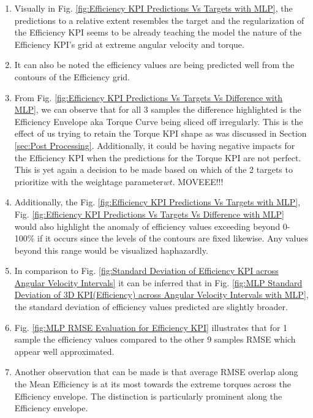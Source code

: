 \documentclass{report} %
\begin{document}
\begin{enumerate}[nosep]
    \item Visually in Fig. \ref{fig:Efficiency KPI Predictions Vs Targets with MLP}, the predictions to a relative extent resembles the target and the regularization 
    of the Efficiency \ac{KPI} seems to be already teaching the model the nature of the Efficiency \ac{KPI}'s grid at extreme angular velocity and torque. 
    \item It can also be noted the efficiency values are being predicted well from the contours of the Efficiency grid.
    \item From Fig. \ref{fig:Efficiency KPI Predictions Vs Targets Vs Difference with MLP}, we can observe that for all 3 samples the difference highlighted is 
    the Efficiency Envelope aka Torque Curve being sliced off irregularly. This is the effect of us trying to retain the Torque \ac{KPI} shape as was 
    discussed in Section \ref{sec:Post Processing}.
    Additionally, it could be having negative impacts for the Efficiency \ac{KPI} when the predictions for the Torque \ac{KPI} are not perfect.
    This is yet again a decision to be made based on which of the 2 targets to prioritize with the weightage parameter\textit{$wt$}. MOVEEE!!!
    \item Additionally, the Fig. \ref{fig:Efficiency KPI Predictions Vs Targets with MLP}, Fig. \ref{fig:Efficiency KPI Predictions Vs Targets Vs Difference with MLP} would also 
    highlight the anomaly of efficiency values exceeding beyond 0-100\% if it occurs since the levels of the contours are fixed likewise. 
    Any values beyond this range would be visualized haphazardly.
    \item In comparison to Fig. \ref{fig:Standard Deviation of Efficiency KPI across Angular Velocity Intervals} it can be inferred that in Fig. 
    \ref{fig:MLP Standard Deviation of 3D KPI(Efficiency) across Angular Velocity Intervals with MLP}, the standard deviation of efficiency values predicted are slightly broader.
    \item Fig. \ref{fig:MLP RMSE Evaluation for Efficiency KPI} illustrates that for 1 sample the efficiency values compared to the other 9 samples \ac{RMSE} which appear 
    well approximated.  
    \item Another observation that can be made is that average \ac{RMSE} overlap along the Mean Efficiency is at its most towards the extreme torques across the 
    Efficiency envelope. The distinction is particularly prominent along the Efficiency envelope.

\end{enumerate}
\end{document}

